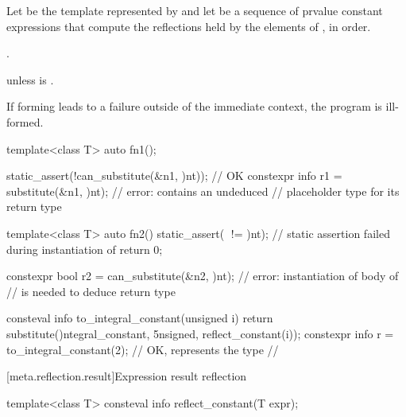 \begin{itemdescr}
\pnum
Let  be the template represented by 
and let  be a sequence of prvalue constant expressions
that compute the reflections held by the elements of ,
in order.

\pnum
\returns
{}.

\pnum
\throws
{} unless
 is .

\pnum
\begin{note}
If forming  leads to a failure outside of the immediate context,
the program is ill-formed.
\end{note}

\pnum
\begin{example}
\begin{codeblock}
template<class T>
  auto fn1();

static_assert(!can_substitute(^^fn1, {^^int}));         // OK
constexpr info r1 = substitute(^^fn1, {^^int});         // error:  contains an undeduced
                                                        // placeholder type for its return type

template<class T>
  auto fn2() {
    static_assert(^^T != ^^int);    // static assertion failed during instantiation of 
    return 0;
  }

constexpr bool r2 = can_substitute(^^fn2, {^^int});     // error: instantiation of body of 
                                                        // is needed to deduce return type
\end{codeblock}
\end{example}

\pnum
\begin{example}
\begin{codeblock}
consteval info to_integral_constant(unsigned i) {
  return substitute(^^integral_constant, {^^unsigned, reflect_constant(i)});
}
constexpr info r = to_integral_constant(2);     // OK,  represents the type
                                                // 
\end{codeblock}
\end{example}
\end{itemdescr}

[meta.reflection.result]{Expression result reflection}

%
\begin{itemdecl}
template<class T>
  consteval info reflect_constant(T expr);
\end{itemdecl}

